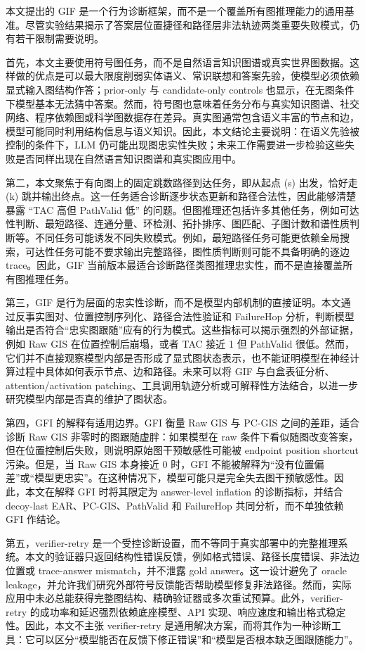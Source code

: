 \documentclass[
  11pt,
]{article}
\begin{document}
本文提出的 GIF
是一个行为诊断框架，而不是一个覆盖所有图推理能力的通用基准。尽管实验结果揭示了答案层位置捷径和路径层非法轨迹两类重要失败模式，仍有若干限制需要说明。

首先，本文主要使用符号图任务，而不是自然语言知识图谱或真实世界图数据。这样做的优点是可以最大限度削弱实体语义、常识联想和答案先验，使模型必须依赖显式输入图结构作答；prior-only
与 candidate-only controls
也显示，在无图条件下模型基本无法猜中答案。然而，符号图也意味着任务分布与真实知识图谱、社交网络、程序依赖图或科学图数据存在差异。真实图通常包含语义丰富的节点和边，模型可能同时利用结构信息与语义知识。因此，本文结论主要说明：在语义先验被控制的条件下，LLM
仍可能出现图忠实性失败；未来工作需要进一步检验这些失败是否同样出现在自然语言知识图谱和真实图应用中。

第二，本文聚焦于有向图上的固定跳数路径到达任务，即从起点 (s)
出发，恰好走 (k)
跳并输出终点。这一任务适合诊断逐步状态更新和路径合法性，因此能够清楚暴露
``TAC 高但 PathValid 低''
的问题。但图推理还包括许多其他任务，例如可达性判断、最短路径、连通分量、环检测、拓扑排序、图匹配、子图计数和谱性质判断等。不同任务可能诱发不同失败模式。例如，最短路径任务可能更依赖全局搜索，可达性任务可能不要求输出完整路径，图性质判断则可能不具备明确的逐边
trace。因此，GIF
当前版本最适合诊断路径类图推理忠实性，而不是直接覆盖所有图推理任务。

第三，GIF
是行为层面的忠实性诊断，而不是模型内部机制的直接证明。本文通过反事实图对、位置控制序列化、路径合法性验证和
FailureHop
分析，判断模型输出是否符合``忠实图跟随''应有的行为模式。这些指标可以揭示强烈的外部证据，例如
Raw GIS 在位置控制后崩塌，或者 TAC 接近 1 但 PathValid
很低。然而，它们并不直接观察模型内部是否形成了显式图状态表示，也不能证明模型在神经计算过程中具体如何表示节点、边和路径。未来可以将
GIF 与白盒表征分析、attention/activation
patching、工具调用轨迹分析或可解释性方法结合，以进一步研究模型内部是否真的维护了图状态。

第四，GFI 的解释有适用边界。GFI 衡量 Raw GIS 与 PC-GIS
之间的差距，适合诊断 Raw GIS 非零时的图跟随虚胖：如果模型在 raw
条件下看似随图改变答案，但在位置控制后失败，则说明原始图干预敏感性可能被
endpoint position shortcut 污染。但是，当 Raw GIS 本身接近 0 时，GFI
不能被解释为``没有位置偏差''或``模型更忠实''。在这种情况下，模型可能只是完全失去图干预敏感性。因此，本文在解释
GFI 时将其限定为 answer-level inflation 的诊断指标，并结合 decoy-last
EAR、PC-GIS、PathValid 和 FailureHop 共同分析，而不单独依赖 GFI 作结论。

第五，verifier-retry
是一个受控诊断设置，而不等同于真实部署中的完整推理系统。本文的验证器只返回结构性错误反馈，例如格式错误、路径长度错误、非法边位置或
trace-answer mismatch，并不泄露 gold answer。这一设计避免了 oracle
leakage，并允许我们研究外部符号反馈能否帮助模型修复非法路径。然而，实际应用中未必总能获得完整图结构、精确验证器或多次重试预算。此外，verifier-retry
的成功率和延迟强烈依赖底座模型、API
实现、响应速度和输出格式稳定性。因此，本文不主张 verifier-retry
是通用解决方案，而将其作为一种诊断工具：它可以区分``模型能否在反馈下修正错误''和``模型是否根本缺乏图跟随能力''。
\end{document}
